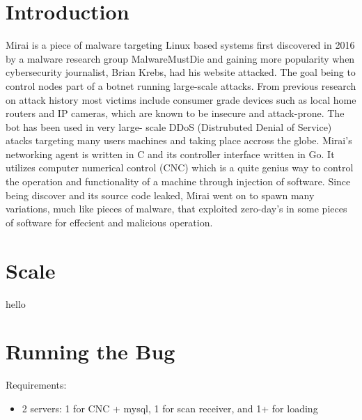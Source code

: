 \documentclass[12pt, letterpaper]{article}
\begin{document}
\begin{sloppypar}



\section*{Introduction}
\begin{flushleft}
Mirai is a piece of malware targeting Linux based systems first discovered in 2016 by 
a malware research group MalwareMustDie and gaining more popularity when cybersecurity 
journalist, Brian Krebs, had his website attacked. The goal being to control nodes
part of a botnet running large-scale attacks. From previous research on attack history
most victims include consumer grade devices such as local home routers and IP cameras, 
which are known to be insecure and attack-prone. The bot has been used in very large-
scale DDoS (Distrubuted Denial of Service) atacks targeting many users machines and 
taking place accross the globe. Mirai's networking agent is written in C and its 
controller interface written in Go. It utilizes computer numerical control (CNC) which 
is a quite genius way to control the operation and functionality of a machine through
injection of software. Since being discover and its source code leaked, Mirai went on 
to spawn many variations, much like pieces of malware, that exploited zero-day's in 
some pieces of software for effecient and malicious operation. 


\end{flushleft}

\section*{Scale}
\begin{flushleft}
hello


\end{flushleft}


\section*{Running the Bug}
\begin{flushleft}

Requirements: \\
\begin{itemize}
\item 2 servers: 1 for CNC + mysql, 1 for scan receiver, and 1+ for loading
\end{itemize}


\end{flushleft}
\end{sloppypar}
\end{document}
